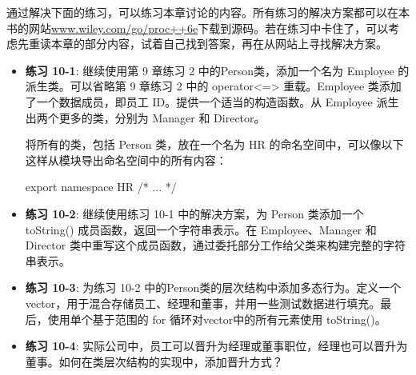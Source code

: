 通过解决下面的练习，可以练习本章讨论的内容。所有练习的解决方案都可以在本书的网站\url{www.wiley.com/go/proc++6e}下载到源码。若在练习中卡住了，可以考虑先重读本章的部分内容，试着自己找到答案，再在从网站上寻找解决方案。

\begin{itemize}
\item
\textbf{练习 10-1}: 继续使用第 9 章练习 2 中的Person类，添加一个名为 Employee 的派生类。可以省略第 9 章练习 2 中的 operator<=> 重载。Employee 类添加了一个数据成员，即员工 ID。提供一个适当的构造函数。从 Employee 派生出两个更多的类，分别为 Manager 和 Director。

将所有的类，包括 Person 类，放在一个名为 HR 的命名空间中，可以像以下这样从模块导出命名空间中的所有内容：

\begin{cpp}
export namespace HR { /* ... */ }
\end{cpp}

\item
\textbf{练习 10-2}: 继续使用练习 10-1 中的解决方案，为 Person 类添加一个 toString() 成员函数，返回一个字符串表示。在 Employee、Manager 和 Director 类中重写这个成员函数，通过委托部分工作给父类来构建完整的字符串表示。

\item
\textbf{练习 10-3}: 为练习 10-2 中的Person类的层次结构中添加多态行为。定义一个vector，用于混合存储员工、经理和董事，并用一些测试数据进行填充。最后，使用单个基于范围的 for 循环对vector中的所有元素使用 toString()。

\item
\textbf{练习 10-4}: 实际公司中，员工可以晋升为经理或董事职位，经理也可以晋升为董事。如何在类层次结构的实现中，添加晋升方式？
\end{itemize}


